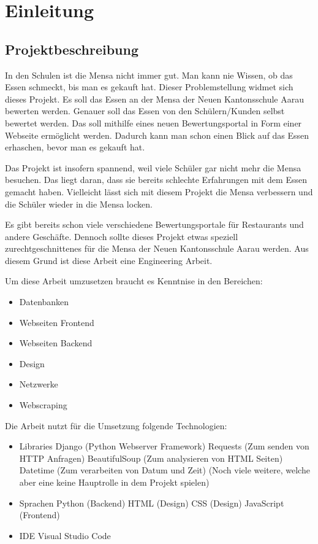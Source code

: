 \chapter{Einleitung}\label{chap:einleit}
\section{Projektbeschreibung}\label{sec:projektbeschreibung}

In den Schulen ist die Mensa nicht immer gut. Man kann nie Wissen, ob das Essen
schmeckt, bis man es gekauft hat. Dieser Problemstellung widmet sich dieses
Projekt. Es soll das Essen an der Mensa der Neuen Kantonsschule Aarau bewerten
werden. Genauer soll das Essen von den Schülern/Kunden selbst bewertet werden.
Das soll mithilfe eines neuen Bewertungsportal in Form einer Webseite ermöglicht
werden. Dadurch kann man schon einen Blick auf das Essen erhaschen, bevor man es
gekauft hat.

Das Projekt ist insofern spannend, weil viele Schüler gar nicht mehr die Mensa
besuchen. Das liegt daran, dass sie bereits schlechte Erfahrungen mit dem Essen
gemacht haben. Vielleicht lässt sich mit diesem Projekt die Mensa verbessern und
die Schüler wieder in die Mensa locken.

Es gibt bereits schon viele verschiedene Bewertungsportale für Restaurants und
andere Geschäfte. Dennoch sollte dieses Projekt etwas speziell
zurechtgeschnittenes für die Mensa der Neuen Kantonsschule Aarau werden.
Aus diesem Grund ist diese Arbeit eine Engineering Arbeit.

\newpage

Um diese Arbeit umzusetzen braucht es Kenntnise in den Bereichen:
\begin{itemize}
    \item Datenbanken
    \item Webseiten Frontend
    \item Webseiten Backend
    \item Design
    \item Netzwerke
    \item Webscraping
\end{itemize}

Die Arbeit nutzt für die Umsetzung folgende Technologien:
\begin{itemize}
    \item Libraries
    \subitem Django (Python Webserver Framework)
    \subitem Requests  (Zum senden von HTTP Anfragen)
    \subitem BeautifulSoup  (Zum analysieren von HTML Seiten)
    \subitem Datetime (Zum verarbeiten von Datum und Zeit)
    \subitem (Noch viele weitere, welche aber eine keine Hauptrolle in dem Projekt spielen)
    \item Sprachen
    \subitem Python (Backend)
    \subitem HTML (Design)
    \subitem CSS (Design)
    \subitem JavaScript (Frontend)
    \item IDE
    \subitem Visual Studio Code
\end{itemize}

